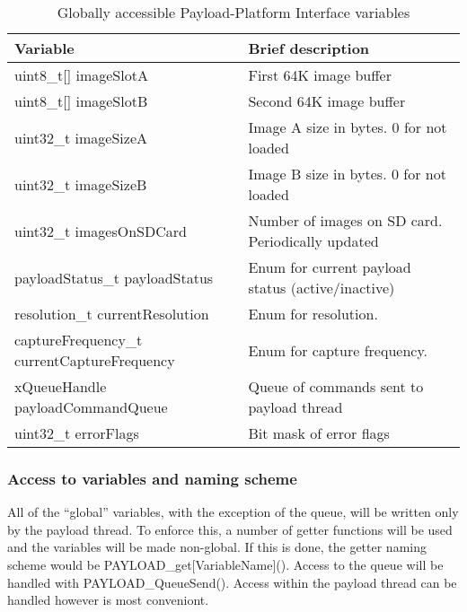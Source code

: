 \documentclass{article}
\begin{document}
\begin{table}
\begin{center}
\caption{Globally accessible Payload-Platform Interface variables}
\begin{tabular}{| l | l |}
    \hline 
    Variable & Brief description \\ \hline
    uint8\_t[] imageSlotA & First 64K image buffer \\ \hline
    uint8\_t[] imageSlotB & Second 64K image buffer \\ \hline
    uint32\_t imageSizeA & Image A size in bytes. 0 for not loaded\\ \hline
    uint32\_t imageSizeB & Image B size in bytes. 0 for not loaded \\ \hline
    uint32\_t imagesOnSDCard & Number of images on SD card. Periodically updated \\ \hline
    payloadStatus\_t payloadStatus & Enum for current payload status (active/inactive) \\ \hline
    resolution\_t currentResolution & Enum for resolution. \\ \hline
    captureFrequency\_t currentCaptureFrequency & Enum for capture frequency. \\ \hline
    xQueueHandle payloadCommandQueue & Queue of commands sent to payload thread \\ \hline
    uint32\_t errorFlags & Bit mask of error flags \\ \hline
\end{tabular}
\end{center}
\end{table}

\subsubsection{Access to variables and naming scheme}
All of the ``global'' variables, with the exception of the queue,
will be written only by the payload thread. To enforce
this, a number of getter functions will be used and the variables will be made non-global.
If this is done, the getter naming scheme would be PAYLOAD_get[VariableName](). Access to the
queue will be handled with PAYLOAD_QueueSend(). Access within the payload thread
can be handled however is most conveniont.
\end{document}
